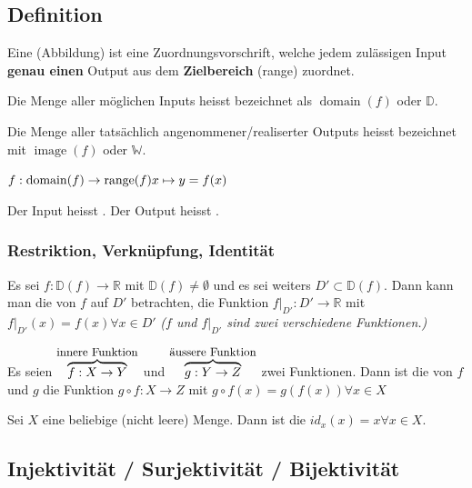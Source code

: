 \subsection{Definition}

Eine  (Abbildung) ist eine Zuordnungsvorschrift, welche jedem zulässigen Input \textbf{genau einen} Output aus dem \textbf{Zielbereich} (range) zuordnet.

Die Menge aller möglichen Inputs heisst  bezeichnet als $\operatorname{domain}(f)$ oder $\mathbb{D}$.

Die Menge aller tatsächlich angenommener/realiserter Outputs heisst  bezeichnet mit $\operatorname{image}(f)$ oder $\mathbb{W}$.

$f : \operatorname{domain}(f) \rightarrow \operatorname{range}(f)\\
x \mapsto y = f(x)$

Der Input heisst .
Der Output heisst .

\subsubsection{Restriktion, Verknüpfung, Identität}

Es sei $f: \mathbb{D}(f) \rightarrow \mathbb{R}$ mit $\mathbb{D}(f) \neq \emptyset$ und es sei weiters $D' \subset \mathbb{D}(f)$.
Dann kann man die  von $f$ auf $D'$ betrachten, die Funktion $f|_{D'} : D' \rightarrow \mathbb{R}$ mit $f|_{D'}(x)=f(x) \forall x \in D'$
\textit{($f$ und $f|_{D'}$ sind zwei verschiedene Funktionen.)}

Es seien $\overbrace{f : X \rightarrow Y}^{\text{\small{innere Funktion}}}$ und $\overbrace{g: Y \rightarrow Z}^{\text{\small{äussere Funktion}}}$ zwei Funktionen. 
Dann ist die  von $f$ und $g$ die Funktion $g \circ f : X \rightarrow Z$ mit $g \circ f(x) = g(f(x)) \forall x \in X$

Sei $X$ eine beliebige (nicht leere) Menge. Dann ist die  $id_x (x) = x \forall x \in X$.

\subsection{Injektivität / Surjektivität / Bijektivität}

